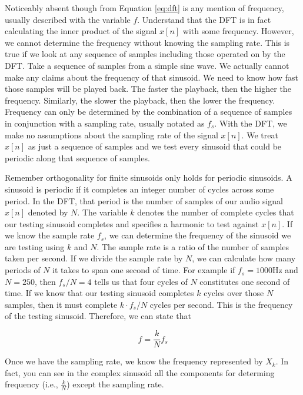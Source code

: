Noticeably absent though from Equation \ref{eq:dft} is any mention of frequency, usually described with the
variable $f$.  Understand that the DFT is in fact calculating the inner product of the signal $x[n]$ with some
 frequency.  However, we cannot determine the frequency without knowing the sampling rate.  This is
 true if we look at any sequence of samples including those operated on by the DFT.
Take a sequence of samples from a simple sine wave.  We actually cannot make any
claims about the frequency of that sinusoid.  We need to know how fast those samples will be played back.  
 The faster the playback, then the higher the frequency.  Similarly, the slower the playback, then the lower
 the frequency.  Frequency can only be determined by the combination 
 of a sequence of samples in conjunction with a sampling rate, usually notated as $f_s$.  With the DFT, we
 make no assumptions about the sampling rate of the signal $x[n]$.  We treat $x[n]$ as just a sequence of
 samples and we test every sinusoid that could be periodic along that sequence of samples.

Remember orthogonality for finite sinusoids only holds for periodic sinusoids.  A sinusoid is periodic if it
completes an integer number of cycles across some period. 
In the DFT, that period is the number of samples of our audio signal $x[n]$ denoted by $N$. 
The variable $k$ denotes
the number of complete cycles that our testing sinusoid completes and specifies a harmonic
to test against $x[n]$.  If we know the sample rate $f_s$, we
can determine the frequency of the sinusoid we are testing using $k$ and $N$.  The sample rate is a ratio of
the number of samples taken per second.  If we divide the sample rate by $N$, we can calculate how many 
periods of $N$ it takes to span one second of time.  For example if $f_s = 1000$Hz and $N = 250$, then
$f_s/N = 4$ tells us that four cycles of $N$ constitutes one second of time.  If we know that our testing sinusoid
completes $k$ cycles over those $N$ samples, then it must complete $k \cdot f_s/N$ cycles per second.  This is
the frequency of the testing sinusoid.  Therefore, we can state that 

\begin{equation}
	\label{eq:freq}
	f = \frac{k}{N}f_s
\end{equation} 

\noindent Once we have the sampling rate, we know the
frequency represented by $X_k$.  In fact, you can see in the complex sinusoid
all the components for determing frequency (i.e., $\frac{k}{N}$) except the sampling rate.  
	
